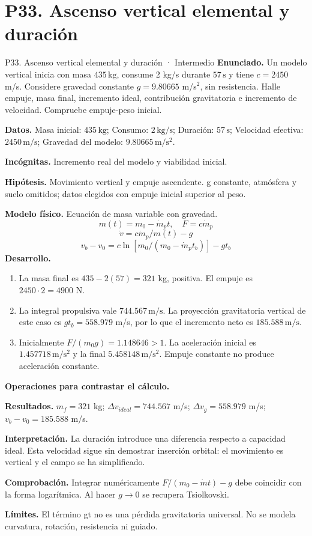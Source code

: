 \section{P33. Ascenso vertical elemental y duración}
\begin{studiumworked}{P33. Ascenso vertical elemental y duración · Intermedio}
\textbf{Enunciado.} Un modelo vertical inicia con masa $435\,\mathrm{kg}$, consume 2 kg/s durante $57\,\mathrm{s}$ y tiene $c=2450$ m/s. Considere gravedad constante $g=9.80665$ m/s$^2$, sin resistencia. Halle empuje, masa final, incremento ideal, contribución gravitatoria e incremento de velocidad. Compruebe empuje-peso inicial.

\textbf{Datos.} Masa inicial: $435\,\mathrm{kg}$; Consumo: $2\,\mathrm{kg/s}$; Duración: $57\,\mathrm{s}$; Velocidad efectiva: $2450\,\mathrm{m/s}$; Gravedad del modelo: $9.80665\,\mathrm{m/s^2}$.

\textbf{Incógnitas.} Incremento real del modelo y viabilidad inicial.

\textbf{Hipótesis.} Movimiento vertical y empuje ascendente. g constante, atmósfera y suelo omitidos; datos elegidos con empuje inicial superior al peso.

\textbf{Modelo físico.} Ecuación de masa variable con gravedad.
\[m(t)=m_0-\dot m_pt,\quad F=c\dot m_p\]
\[\dot v=c\dot m_p/m(t)-g\]
\[v_b-v_0=c\ln[m_0/(m_0-\dot m_pt_b)]-gt_b\]
\textbf{Desarrollo.}
\begin{enumerate}
\item La masa final es $435-2(57)=321$ kg, positiva. El empuje es $2450\cdot2=4900$ N.
\item La integral propulsiva vale $744.567\,\mathrm{m/s}$. La proyección gravitatoria vertical de este caso es $g t_b=558.979$ m/s, por lo que el incremento neto es $185.588\,\mathrm{m/s}$.
\item Inicialmente $F/(m_0g)=1.148646>1$. La aceleración inicial es $1.457718\,\mathrm{m/s^2}$ y la final $5.458148\,\mathrm{m/s^2}$. Empuje constante no produce aceleración constante.
\end{enumerate}
\textbf{Operaciones para contrastar el cálculo.}

\textbf{Resultados.} $m_f=321$ kg; $\Delta v_{ideal}=744.567$ m/s; $\Delta v_g=558.979$ m/s; $v_b-v_0=185.588$ m/s.

\textbf{Interpretación.} La duración introduce una diferencia respecto a capacidad ideal. Esta velocidad sigue sin demostrar inserción orbital: el movimiento es vertical y el campo se ha simplificado.

\textbf{Comprobación.} Integrar numéricamente $F/(m_0-\dot m t)-g$ debe coincidir con la forma logarítmica. Al hacer $g\to0$ se recupera Tsiolkovski.

\textbf{Límites.} El término gt no es una pérdida gravitatoria universal. No se modela curvatura, rotación, resistencia ni guiado.
\end{studiumworked}
